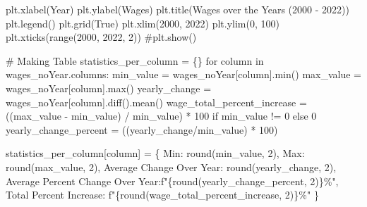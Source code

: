 \documentclass[
  letterpaper,
  DIV=11,
  numbers=noendperiod]{scrartcl}
\newenvironment{Shaded}{\begin{snugshade}}{\end{snugshade}}
\newcommand{\BuiltInTok}[1]{\textcolor[rgb]{0.00,0.23,0.31}{#1}}
\newcommand{\CommentTok}[1]{\textcolor[rgb]{0.37,0.37,0.37}{#1}}
\newcommand{\ControlFlowTok}[1]{\textcolor[rgb]{0.00,0.23,0.31}{#1}}
\newcommand{\DecValTok}[1]{\textcolor[rgb]{0.68,0.00,0.00}{#1}}
\newcommand{\KeywordTok}[1]{\textcolor[rgb]{0.00,0.23,0.31}{#1}}
\newcommand{\NormalTok}[1]{\textcolor[rgb]{0.00,0.23,0.31}{#1}}
\newcommand{\OperatorTok}[1]{\textcolor[rgb]{0.37,0.37,0.37}{#1}}
\newcommand{\SpecialCharTok}[1]{\textcolor[rgb]{0.37,0.37,0.37}{#1}}
\newcommand{\SpecialStringTok}[1]{\textcolor[rgb]{0.13,0.47,0.30}{#1}}
\newcommand{\StringTok}[1]{\textcolor[rgb]{0.13,0.47,0.30}{#1}}
\newcommand{\VariableTok}[1]{\textcolor[rgb]{0.07,0.07,0.07}{#1}}
\begin{document}
\begin{Shaded}
\begin{Highlighting}[]
\NormalTok{plt.xlabel(}\StringTok{\textquotesingle{}Year\textquotesingle{}}\NormalTok{)}
\NormalTok{plt.ylabel(}\StringTok{\textquotesingle{}Wages\textquotesingle{}}\NormalTok{)}
\NormalTok{plt.title(}\StringTok{\textquotesingle{}Wages over the Years (2000 {-} 2022)\textquotesingle{}}\NormalTok{)}
\NormalTok{plt.legend()}
\NormalTok{plt.grid(}\VariableTok{True}\NormalTok{)}
\NormalTok{plt.xlim(}\DecValTok{2000}\NormalTok{, }\DecValTok{2022}\NormalTok{)  }
\NormalTok{plt.ylim(}\DecValTok{0}\NormalTok{, }\DecValTok{100}\NormalTok{)}
\NormalTok{plt.xticks(}\BuiltInTok{range}\NormalTok{(}\DecValTok{2000}\NormalTok{, }\DecValTok{2022}\NormalTok{, }\DecValTok{2}\NormalTok{))}
\CommentTok{\#plt.show()}

\CommentTok{\# Making Table}
\NormalTok{statistics\_per\_column }\OperatorTok{=}\NormalTok{ \{\}}
\ControlFlowTok{for}\NormalTok{ column }\KeywordTok{in}\NormalTok{ wages\_noYear.columns:}
\NormalTok{    min\_value }\OperatorTok{=}\NormalTok{ wages\_noYear[column].}\BuiltInTok{min}\NormalTok{()}
\NormalTok{    max\_value }\OperatorTok{=}\NormalTok{ wages\_noYear[column].}\BuiltInTok{max}\NormalTok{()}
\NormalTok{    yearly\_change }\OperatorTok{=}\NormalTok{ wages\_noYear[column].diff().mean()}
\NormalTok{    wage\_total\_percent\_increase }\OperatorTok{=}\NormalTok{ ((max\_value }\OperatorTok{{-}}\NormalTok{ min\_value) }\OperatorTok{/}\NormalTok{ min\_value) }\OperatorTok{*} \DecValTok{100} \ControlFlowTok{if}\NormalTok{ min\_value }\OperatorTok{!=} \DecValTok{0} \ControlFlowTok{else} \DecValTok{0}
\NormalTok{    yearly\_change\_percent }\OperatorTok{=}\NormalTok{ ((yearly\_change}\OperatorTok{/}\NormalTok{min\_value) }\OperatorTok{*} \DecValTok{100}\NormalTok{)}

\NormalTok{    statistics\_per\_column[column] }\OperatorTok{=}\NormalTok{ \{}
        \StringTok{\textquotesingle{}Min\textquotesingle{}}\NormalTok{: }\BuiltInTok{round}\NormalTok{(min\_value, }\DecValTok{2}\NormalTok{),}
        \StringTok{\textquotesingle{}Max\textquotesingle{}}\NormalTok{: }\BuiltInTok{round}\NormalTok{(max\_value, }\DecValTok{2}\NormalTok{),}
        \StringTok{\textquotesingle{}Average Change Over Year\textquotesingle{}}\NormalTok{: }\BuiltInTok{round}\NormalTok{(yearly\_change, }\DecValTok{2}\NormalTok{),}
        \StringTok{\textquotesingle{}Average Percent Change Over Year\textquotesingle{}}\NormalTok{:}\SpecialStringTok{f"}\SpecialCharTok{\{}\BuiltInTok{round}\NormalTok{(yearly\_change\_percent, }\DecValTok{2}\NormalTok{)}\SpecialCharTok{\}}\SpecialStringTok{\%"}\NormalTok{,}
        \StringTok{\textquotesingle{}Total Percent Increase\textquotesingle{}}\NormalTok{: }\SpecialStringTok{f"}\SpecialCharTok{\{}\BuiltInTok{round}\NormalTok{(wage\_total\_percent\_increase, }\DecValTok{2}\NormalTok{)}\SpecialCharTok{\}}\SpecialStringTok{\%"}
\NormalTok{    \}}


\end{Highlighting}
\end{Shaded}
\end{document}
